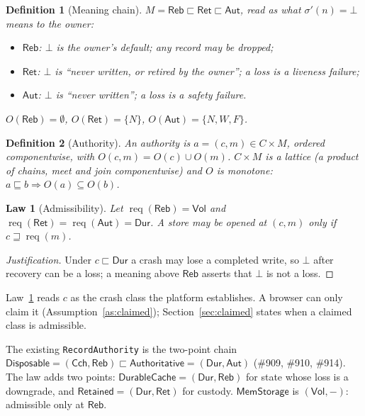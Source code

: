 \documentclass[journal]{IEEEtran}
\newtheorem{definition}{Definition}
\newtheorem{law}{Law}
\newcommand{\req}{\operatorname{req}}
\newcommand{\Volatile}{\mathsf{Vol}}
\newcommand{\Cached}{\mathsf{Cch}}
\newcommand{\Durable}{\mathsf{Dur}}
\newcommand{\Rebuild}{\mathsf{Reb}}
\newcommand{\Retained}{\mathsf{Ret}}
\newcommand{\Auth}{\mathsf{Aut}}
\begin{document}
\begin{definition}[Meaning chain]\label{def:meaningchain}
$M=\Rebuild\sqsubset\Retained\sqsubset\Auth$, read as what $\sigma'(n)=\bot$ means to the
owner:
\begin{itemize}[leftmargin=1.2em]
\item $\Rebuild$: $\bot$ is the owner's default; any record may be dropped;
\item $\Retained$: $\bot$ is ``never written, or retired by the owner''; a loss is a
liveness failure;
\item $\Auth$: $\bot$ is ``never written''; a loss is a safety failure.
\end{itemize}
$O(\Rebuild)=\emptyset$, $O(\Retained)=\{N\}$, $O(\Auth)=\{N,W,F\}$.
\end{definition}

\begin{definition}[Authority]\label{def:authority}
An authority is $a=(c,m)\in C\times M$, ordered componentwise, with
$O(c,m)=O(c)\cup O(m)$.  $C\times M$ is a lattice (a product of chains, meet and join
componentwise) and $O$ is monotone: $a\sqsubseteq b\Rightarrow O(a)\subseteq O(b)$.
\end{definition}

\begin{law}[Admissibility]\label{law:admissible}
Let $\req(\Rebuild)=\Volatile$ and $\req(\Retained)=\req(\Auth)=\Durable$.  A store may be
opened at $(c,m)$ only if $c\sqsupseteq\req(m)$.
\end{law}
\begin{proof}[Justification]
Under $c\sqsubset\Durable$ a crash may lose a completed write, so $\bot$ after recovery can
be a loss; a meaning above $\Rebuild$ asserts that $\bot$ is not a loss.
\end{proof}
Law~\ref{law:admissible} reads $c$ as the crash class the platform establishes.  A browser
can only claim it (Assumption~\ref{as:claimed}); Section~\ref{sec:claimed} states when a
claimed class is admissible.

The existing \texttt{RecordAuthority} is the two-point chain
$\mathsf{Disposable}=(\Cached,\Rebuild)\sqsubset\mathsf{Authoritative}=(\Durable,\Auth)$
(\#909, \#910, \#914).  The law adds two points:
$\mathsf{DurableCache}=(\Durable,\Rebuild)$ for state whose loss is a downgrade, and
$\mathsf{Retained}=(\Durable,\Retained)$ for custody.  $\mathsf{MemStorage}$ is
$(\Volatile,-)$: admissible only at $\Rebuild$.
\end{document}
